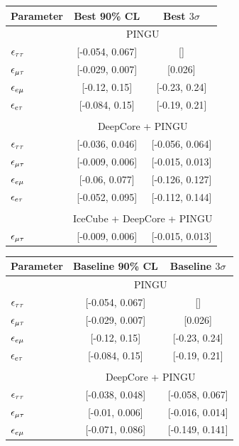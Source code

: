 {{\begin{table}
   \centering
   \begin{tabular}{lcc}
      \hline
      Parameter & Best 90\% CL & Best $3\sigma$\\
      \hline & \multicolumn{2}{c}{PINGU} \\
      $\epsilon_{\tau\tau}$ &  [-0.054, 0.067] &               [] \\
      $\epsilon_{\mu\tau}$ &  [-0.029, 0.007] &          [0.026] \\
      $\epsilon_{e\mu}$ &  [-0.12, 0.15] &  [-0.23, 0.24] \\
      $\epsilon_{e\tau}$ &   [-0.084, 0.15] &  [-0.19, 0.21] \\\\
      & \multicolumn{2}{c}{DeepCore + PINGU} \\
      $\epsilon_{\tau\tau}$ &  [-0.036, 0.046] &  [-0.056, 0.064] \\
      $\epsilon_{\mu\tau}$ &  [-0.009, 0.006] &  [-0.015, 0.013] \\
      $\epsilon_{e\mu}$ &   [-0.06, 0.077] &  [-0.126, 0.127] \\
      $\epsilon_{e\tau}$ &  [-0.052, 0.095] &  [-0.112, 0.144] \\\\
      & \multicolumn{2}{c}{IceCube + DeepCore + PINGU}  \\
      $\epsilon_{\mu\tau}$ &  [-0.009, 0.006] &  [-0.015, 0.013]  \\
      \hline
   \end{tabular}
   \begin{tabular}{lcc}
      \hline 
      Parameter & Baseline 90\% CL & Baseline $3\sigma$\\
      \hline & \multicolumn{2}{c}{PINGU} \\
      $\epsilon_{\tau\tau}$ &   [-0.054, 0.067] &               []\\
      $\epsilon_{\mu\tau}$  &  [-0.029, 0.007] &          [0.026]  \\
      $\epsilon_{e\mu}$ &    [-0.12, 0.15] &  [-0.23, 0.24] \\
      $\epsilon_{e\tau}$ &    [-0.084, 0.15] &  [-0.19, 0.21] \\\\
      & \multicolumn{2}{c}{DeepCore + PINGU} \\
      $\epsilon_{\tau\tau}$ &    [-0.038, 0.048] &  [-0.058, 0.067] \\
      $\epsilon_{\mu\tau}$ &    [-0.01, 0.006] &  [-0.016, 0.014] \\
      $\epsilon_{e\mu}$ &    [-0.071, 0.086] &  [-0.149, 0.141]  \\

\end{tabular}
\end{table}}}
